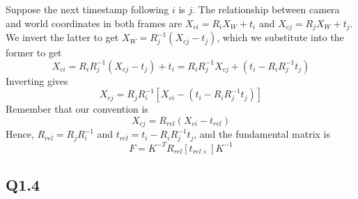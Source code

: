 \documentclass{article} %
\begin{document}
    Suppose the next timestamp following $i$ is $j$. The relationship between camera and world coordinates in both frames are $X_{ci}=R_{i}X_{W}+t_{i}$ and $X_{cj}=R_{j}X_{W}+t_{j}$. We invert the latter to get $X_{W}={R}_{j}^{-1}(X_{cj}-t_{j})$, which we substitute into the former to get
    \begin{equation*}
    X_{ci}=R_{i}{R}_{j}^{-1}\left(X_{cj}-t_{j}\right)+t_{i}=R_{i}{R}_{j}^{-1}X_{cj}+\left(t_{i}-R_{i}{R}_{j}^{-1}t_{j}\right)
    \end{equation*}
    Inverting gives
    \begin{equation*}
    X_{cj}=R_{j}{R}_{i}^{-1}\left[X_{ci}-\left(t_{i}-R_{i}{R}_{j}^{-1}t_{j}\right)\right]
    \end{equation*}
    Remember that our convention is
    \begin{equation*}
    X_{cj}=R_{rel}\left(X_{ci}-t_{rel}\right)
    \end{equation*}
    Hence, $R_{rel}=R_{j}{R}_{i}^{-1}$ and $t_{rel}=t_{i}-R_{i}{R}_{j}^{-1}t_{j}$, and the fundamental matrix is
    \begin{equation*}
    F=K^{-T}R_{rel}\left[t_{rel\times }\right]K^{-1}
    \end{equation*}
    \subsection*{Q1.4}
\end{document}
